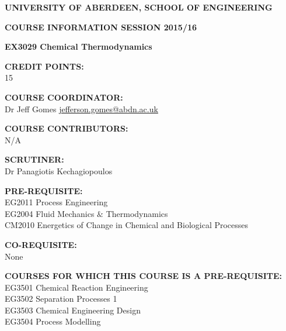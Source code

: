 \documentclass[12pts,a4paper,amsmath,amssymb,floatfix]{article}%
\begin{document}
\begin{center}
{\large {\bf UNIVERSITY OF ABERDEEN, SCHOOL OF ENGINEERING}}
\medskip

{\large {\bf COURSE INFORMATION SESSION 2015/16}}
\bigskip 

{\Large {\bf EX3029 Chemical Thermodynamics}}
\end{center}

\bigskip
\begin{flushleft}

{\large {\bf CREDIT POINTS:}}\\
\hspace{0.8cm}15
\medskip

{\large {\bf COURSE COORDINATOR: }}\\
\hspace{0.8cm}Dr Jeff Gomes \hspace{1.5cm} \href{mailto:jefferson.gomes@abdn.ac.uk}{jefferson.gomes@abdn.ac.uk}
\medskip 

{\large {\bf COURSE CONTRIBUTORS:}}\\
\hspace{0.8cm}N/A
\medskip

{\large {\bf SCRUTINER:}}\\
\hspace{0.8cm}Dr Panagiotis Kechagiopoulos
\medskip  

{\large {\bf PRE-REQUISITE:}}\\
\hspace{0.8cm}EG2011 Process Engineering\\
\hspace{0.8cm}EG2004 Fluid Mechanics $\&$ Thermodynamics\\
\hspace{0.8cm}CM2010 Energetics of Change in Chemical and Biological Processes

\medskip

{\large {\bf CO-REQUISITE:}}\\
\hspace{0.8cm}None
\medskip 

{\large {\bf COURSES FOR WHICH THIS COURSE IS A PRE-REQUISITE:}}\\
\hspace{0.8cm}EG3501 Chemical Reaction Engineering\\
\hspace{0.8cm}EG3502 Separation Processes 1\\
\hspace{0.8cm}EG3503 Chemical Engineering Design\\
\hspace{0.8cm}EG3504 Process Modelling\\ 
\end{flushleft}
\end{document}
